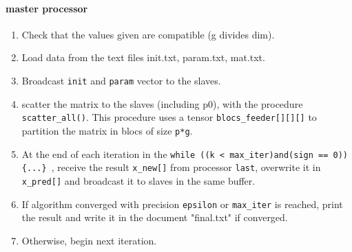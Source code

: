 \documentclass[a4paper,12pt]{article}
\begin{document}
\paragraph{master processor}
\begin{enumerate}
\item Check that the values given are compatible (g divides dim).
\item Load data from the text files init.txt, param.txt, mat.txt.
\item Broadcast {\tt init} and {\tt param} vector to the slaves.
\item scatter the matrix to the slaves (including p0), with the procedure {\tt scatter\_all()}. This procedure uses a tensor {\tt blocs\_feeder[][][]} to partition the matrix in blocs of size {\tt p*g}.
\item At the end of each iteration in the {\tt while ((k < max\_iter)and(sign == 0)) \{...\} }, receive the result {\tt x\_new[]} from processor {\tt last}, overwrite it in {\tt x\_pred[]} and broadcast it to slaves in the same buffer.
\item If algorithm converged with precision {\tt epsilon} or {\tt max\_iter} is reached, print the result and write it in the document "final.txt" if converged.
\item Otherwise, begin next iteration.
\end{enumerate}
\end{document}
